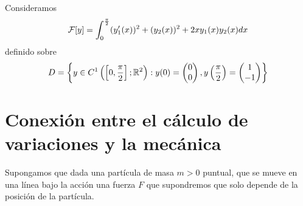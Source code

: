 \begin{ejemplo}
    Consideramos 
    \begin{gather*}
        \mathcal{F}[y] = \int_{0}^{\frac{\pi}{2}} (y_1'(x))^2 + (y_2(x))^2 + 2xy_1(x)y_2(x) dx
    \end{gather*}
    definido sobre
    \begin{gather*}
        D = \left\{y\in C^1\left(\left[0,\frac{\pi}{2}\right];\mathbb{R}^2\right) : y(0) = 
        \begin{pmatrix}
            0\\ 0
        \end{pmatrix}
        , y\left(\frac{\pi}{2}\right) = 
        \begin{pmatrix}
            1 \\ -1
        \end{pmatrix}
        \right\}
    \end{gather*} 
\end{ejemplo}

\section{Conexión entre el cálculo de variaciones y la mecánica}

Supongamos que dada una partícula de masa $m>0$ puntual, que se mueve en una línea bajo la acción una fuerza $F$ que supondremos que solo depende de la posición de la partícula.\\

